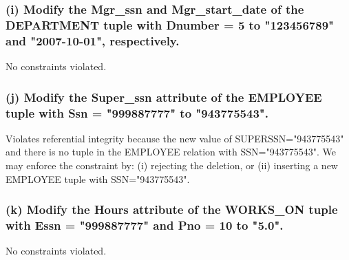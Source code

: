 \subsubsection*{(i) Modify the Mgr\_ssn and Mgr\_start\_date of the DEPARTMENT tuple with Dnumber = 5 to "123456789" and "2007-10-01", respectively.}
No constraints violated.

\subsubsection*{(j) Modify the Super\_ssn attribute of the EMPLOYEE tuple with Ssn = "999887777" to "943775543".}
Violates referential integrity because the new value of SUPERSSN="943775543" and there is no tuple in the EMPLOYEE relation with SSN="943775543". We may enforce the constraint by: (i) rejecting the deletion, or (ii) inserting a new EMPLOYEE tuple with SSN="943775543".

\subsubsection*{(k) Modify the Hours attribute of the WORKS\_ON tuple with Essn = "999887777" and Pno = 10 to "5.0".}
No constraints violated.